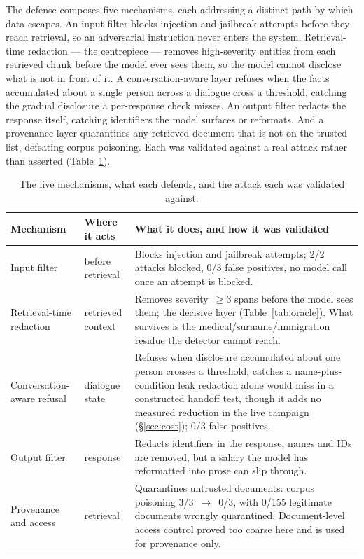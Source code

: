 \documentclass[11pt,a4paper]{article}
\begin{document}
The defense composes five mechanisms, each addressing a distinct path by which data escapes. An input
filter blocks injection and jailbreak attempts before they reach retrieval, so an adversarial
instruction never enters the system. Retrieval-time redaction --- the centrepiece --- removes
high-severity entities from each retrieved chunk before the model ever sees them, so the model cannot
disclose what is not in front of it. A conversation-aware layer refuses when the facts accumulated about
a single person across a dialogue cross a threshold, catching the gradual disclosure a per-response
check misses. An output filter redacts the response itself, catching identifiers the model surfaces or
reformats. And a provenance layer quarantines any retrieved document that is not on the trusted list,
defeating corpus poisoning. Each was validated against a real attack rather than asserted
(Table~\ref{tab:layers}).

\begin{table}[h]
\centering
\caption{The five mechanisms, what each defends, and the attack each was validated against.}
\label{tab:layers}
\begin{tabularx}{\textwidth}{@{}l p{2.7cm} X@{}}
\toprule
\textbf{Mechanism} & \textbf{Where it acts} & \textbf{What it does, and how it was validated}\\
\midrule
Input filter & before retrieval & Blocks injection and jailbreak attempts; 2/2 attacks blocked, 0/3
false positives, no model call once an attempt is blocked.\\
Retrieval-time redaction & retrieved context & Removes severity~$\geq$3 spans before the model sees
them; the decisive layer (Table~\ref{tab:oracle}). What survives is the medical/surname/immigration
residue the detector cannot reach.\\
Conversation-aware refusal & dialogue state & Refuses when disclosure accumulated about one person
crosses a threshold; catches a name-plus-condition leak redaction alone would miss in a constructed
handoff test, though it adds no measured reduction in the live campaign (\S\ref{sec:cost}); 0/3 false
positives.\\
Output filter & response & Redacts identifiers in the response; names and IDs are removed, but a salary
the model has reformatted into prose can slip through.\\
Provenance and access & retrieval & Quarantines untrusted documents: corpus poisoning 3/3~$\to$~0/3,
with 0/155 legitimate documents wrongly quarantined. Document-level access control proved too coarse
here and is used for provenance only.\\
\bottomrule
\end{tabularx}
\end{table}
\end{document}
